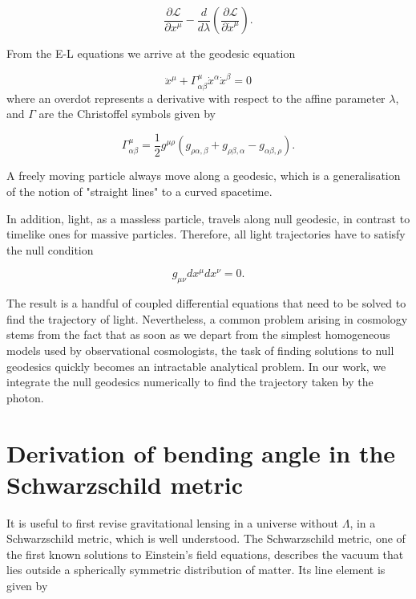 \begin{equation}
  \frac{\partial \mathcal{L}}{\partial x^{\mu}} - \frac{d}{d \lambda}\left ( \frac{\partial \mathcal{L}}{\partial \dot{x}^{\mu}} \right ).
  \label{eq:euler-lagrange-eqn}
\end{equation}

From the E-L equations we arrive at the geodesic equation

\begin{equation}
  \ddot{x}^{\mu} + \Gamma^{\mu}_{\alpha \beta} \dot{x}^{\alpha} \dot{x}^{\beta} = 0 
  \label{eq:geodesic-eqn}
\end{equation}
where an overdot represents a derivative with respect to the affine parameter $\lambda$, and $\Gamma$ are the Christoffel symbols given by

\begin{equation}
  \Gamma^{\mu}_{\alpha \beta} = \frac{1}{2} g^{\mu \rho} (g_{\rho \alpha, \beta} + g_{\rho \beta, \alpha} - g_{\alpha \beta, \rho}).
  \label{eq:christoffels}
\end{equation}

A freely moving particle always move along a geodesic, which is a generalisation of the notion of "straight lines" to a curved spacetime. 

In addition, light, as a massless particle, travels along null geodesic, in contrast to timelike ones for massive particles. Therefore, all light trajectories have to satisfy the null condition

\begin{equation}
  g_{\mu \nu} dx^{\mu} dx^{\nu} = 0.
  \label{eq:null-condition}
\end{equation}

The result is a handful of coupled differential equations that need to be solved to find the trajectory of light. Nevertheless, a common problem arising in cosmology stems from the fact that as soon as we depart from the simplest homogeneous models used by observational cosmologists, the task of finding solutions to null geodesics quickly becomes an intractable analytical problem. In our work, we integrate the null geodesics numerically to find the trajectory taken by the photon. 

\section{Derivation of bending angle in the Schwarzschild metric}

It is useful to first revise gravitational lensing in a universe without $\Lambda$, in a Schwarzschild metric, which is well understood. The Schwarzschild metric, one of the first known solutions to Einstein's field equations, describes the vacuum that lies outside a spherically symmetric distribution of matter. Its line element is given by

